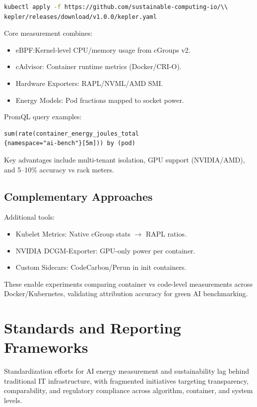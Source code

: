 \begin{lstlisting}[language=Bash]
kubectl apply -f https://github.com/sustainable-computing-io/\\
kepler/releases/download/v1.0.0/kepler.yaml
\end{lstlisting}

Core measurement combines:
\begin{itemize}
    \item eBPF:\@ Kernel-level CPU/memory usage from cGroups v2.
    \item cAdvisor: Container runtime metrics (Docker/CRI-O).
    \item Hardware Exporters: RAPL/NVML/AMD SMI.\@
    \item Energy Models: Pod fractions mapped to socket power.
\end{itemize}

PromQL query examples:
\begin{lstlisting}[language=PromQL]
sum(rate(container_energy_joules_total
{namespace="ai-bench"}[5m])) by (pod)
\end{lstlisting}

Key advantages include multi-tenant isolation, GPU support (NVIDIA/AMD), and 5--10\% accuracy vs rack meters.

\subsection{Complementary Approaches}

Additional tools:
\begin{itemize}
    \item Kubelet Metrics: Native cGroup stats $\to$ RAPL ratios.
    \item NVIDIA DCGM-Exporter: GPU-only power per container.
    \item Custom Sidecars: CodeCarbon/Perun in init containers.
\end{itemize}

These enable experiments comparing container vs code-level measurements across Docker/Kubernetes, validating attribution accuracy for green AI benchmarking.\@

\section{Standards and Reporting Frameworks}

Standardization efforts for AI energy measurement and sustainability lag behind traditional IT infrastructure, with fragmented initiatives targeting transparency, comparability, and regulatory compliance across algorithm, container, and system levels.

